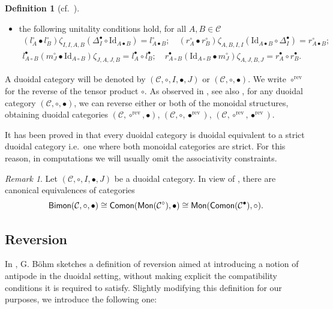 \documentclass[nosumlimits,twoside]{amsart}
\theoremstyle{definition}
\newtheorem{definition}[definition]{\sc Definition}
\theoremstyle{remark}
\newtheorem{remark}[remark]{\sc Remark}
\def\rev{\mathrm{rev}}
\newcommand{\id}{\mathrm{Id}}
\newcommand{\Cc}{\mathcal{C}}
\def\Bimon{{\sf Bimon}}
\def\Comon{{\sf Comon}}
\begin{document}
\begin{definition}[{cf.\ \cite[Definition 6.1]{Aguiar}}]
\begin{itemize}
\begin{gather}
 \end{gather}
 \item[$iii)$] the following unitality conditions hold, for all $A,B\in\Cc$
 \begin{gather}\label{eq:unit1}
         (l^\circ_{A}\bullet l^\circ_B)\zeta_{I,I, A,B}(\Delta^{\bullet}_I\circ\id_{A\bullet B})=l^\circ_{A\bullet B};\quad (r^\circ_A\bullet r^\circ_B)\zeta_{A,B,I,I}(\id_{A\bullet B}\circ\Delta^{\bullet}_I)=r^\circ_{A\bullet B};\\\label{eq:unit2}
    l^\bullet_{A\circ B}(m^{\circ}_J\bullet \id_{A\circ B})\zeta_{J,A,J,B}=l^\bullet_A\circ l^\bullet_B;\quad r^\bullet_{A\circ B}(\id_{A\circ B}\bullet m^{\circ}_J)\zeta_{A,J,B,J}=r^\bullet_A\circ r^\bullet_B.
 \end{gather}
\end{itemize}
\end{definition}
A duoidal category will be denoted by $(\Cc,\circ, I,\bullet, J)$ or $(\Cc,\circ,\bullet)$. We write $\circ ^{\rev }$ for the reverse of the tensor product $\circ$. As observed in \cite[\S 4.1]{Bohm-Lack}, see also \cite[\S 4.3]{Street}, for any duoidal category $(\mathcal{C}, \circ, \bullet)$, we can reverse either or both of the monoidal structures, obtaining duoidal categories $(\mathcal{C}, \circ^\rev, \bullet)$, $(\mathcal{C}, \circ, \bullet^\rev)$,  $(\mathcal{C}, \circ^\rev, \bullet^\rev)$.  


It has been proved in \cite{Batanin-Markl} that every duoidal category is duoidal equivalent to a strict duoidal category i.e.\ one where both monoidal categories are strict. For this reason, in computations we will usually omit the associativity constraints.



\begin{remark}
Let $(\mathcal{C}, \circ, I, \bullet, J)$ be a duoidal category. In view of \cite[Proposition 6.36]{Aguiar}, there are canonical equivalences of categories
\begin{equation}\label{equivalnecesBimonC}
\Bimon (\mathcal{C},\circ,\bullet)\cong\Comon (\mathsf{Mon}(\mathcal{C}^\circ), \bullet)\cong \mathsf{Mon}(\Comon (\mathcal{C}^\bullet), \circ).
\end{equation}
\end{remark}

\subsection{Reversion}
In \cite{Bohm-Canada}, G. B\"ohm sketches a definition of reversion aimed at introducing a notion of antipode in the duoidal setting, without making explicit the compatibility conditions it is required to satisfy. 
Slightly modifying this definition for our
purposes, we introduce the following one:
\end{document}
